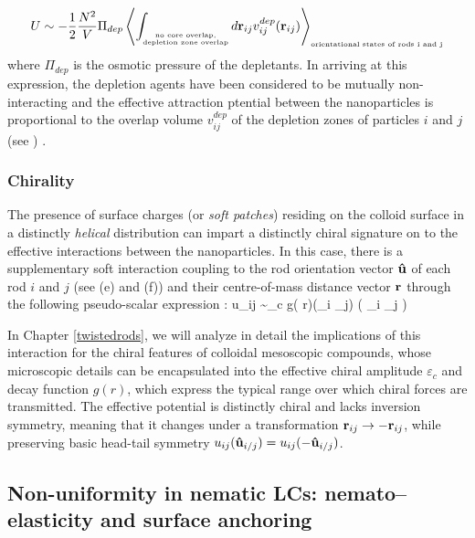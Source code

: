  \begin{equation}
U \sim  -\frac{1}{2} \frac{N^{2}}{V} \Pi_{dep} \left \langle \int_{
\substack{
\mbox{\tiny no core overlap,} \\
\mbox{\tiny depletion zone overlap}
}
} d {\bf r}_{ij}   v^{dep}_{ij}({\bf r}_{ij})  \right \rangle_{\mbox{\tiny orientational states of rods i and j}}
\label{degen}
\end{equation}
where $\Pi_{dep}$ is the osmotic pressure of the depletants. In arriving at this expression, the depletion agents have been considered to be mutually non-interacting and the effective attraction ptential between the nanoparticles is proportional to the overlap volume $v^{dep}_{ij}$ of the depletion zones of particles $i$ and $j$ (see ) \cite{LekkerkerkerTuinier2011}.

\subsubsection{Chirality}

The presence of surface charges (or {\em soft patches}) residing on the colloid surface in a distinctly {\em helical} distribution can impart a distinctly chiral signature on to the effective interactions between the nanoparticles. In this case, there is a supplementary soft interaction coupling to the rod orientation vector ${\bf \hat{u}}$ of each rod $i$ and $j$ (see  (e) and (f)) and their centre-of-mass distance vector $\bf r$ through the following pseudo-scalar expression \cite{goossens1971}:
\beq
u_{ij} \sim  \varepsilon_{c} g( r)({\bf {}}_{i} _{j}) ( {\bf {}}_{i} _{j}  )
\label{chirality}
\eeq

In Chapter \ref{twistedrods}, we will analyze in detail the implications of this interaction for the chiral features of colloidal mesoscopic compounds, whose microscopic details can be encapsulated into the effective chiral amplitude $\varepsilon_c$ and decay function $g(r)$, which express the typical range over which chiral forces are transmitted. The effective potential is distinctly chiral and lacks inversion symmetry, meaning that it changes under a transformation ${\bf r}_{ij} \rightarrow -{\bf r}_{ij} $, while preserving basic head-tail symmetry $u_{ij}({\bf \hat{u}}_{i/j}) = u_{ij}(-{\bf \hat{u}}_{i/j}) $.

\subsection{Non-uniformity in nematic LCs: nemato--elasticity and surface anchoring}
\label{nemelasticity}

